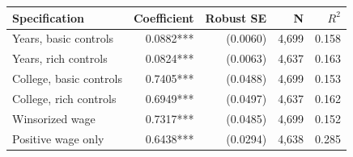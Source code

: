 \begin{tabular}{lrrrr}
\toprule
Specification & Coefficient & Robust SE & N & $R^2$ \\
\midrule
Years, basic controls & 0.0882*** & (0.0060) & 4,699 & 0.158 \\
Years, rich controls & 0.0824*** & (0.0063) & 4,637 & 0.163 \\
College, basic controls & 0.7405*** & (0.0488) & 4,699 & 0.153 \\
College, rich controls & 0.6949*** & (0.0497) & 4,637 & 0.162 \\
Winsorized wage & 0.7317*** & (0.0485) & 4,699 & 0.152 \\
Positive wage only & 0.6438*** & (0.0294) & 4,638 & 0.285 \\
\bottomrule
\end{tabular}
